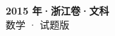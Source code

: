 \documentclass[zihao=-4, a4paper]{ctexart}
\begin{document}
\begin{center}
  {\Large\bfseries 2015 年·浙江卷·文科}\\[4pt]
  {\large 数学 · 试题版}
\end{center}
\medskip
{}

\end{document}
